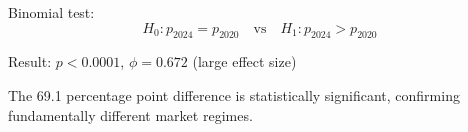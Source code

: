 Binomial test:
\begin{equation}
H_0: p_{2024} = p_{2020} \quad \text{vs} \quad H_1: p_{2024} > p_{2020}
\end{equation}

\noindent Result: $p < 0.0001$, $\phi = 0.672$ (large effect size)

\vspace{0.1cm}

The 69.1 percentage point difference is statistically significant, confirming fundamentally different market regimes.

%
%
%
%
